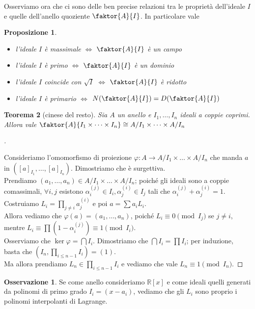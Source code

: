 \documentclass[a4paper,10pt]{article}
\theoremstyle{plain}
\newtheorem{thm}{Teorema}[section]
\newtheorem{prop}[thm]{Proposizione}
\theoremstyle{definition}
\newtheorem*{oss}{Osservazione}
\newenvironment{myproof}[1][\proofname]{%
  \begin{proof}[#1]$ $\par\nobreak\ignorespaces
}{%
  \qedhere
  \end{proof}
}
\newcommand{\R}{\mathbb{R}}
\begin{document}
Osserviamo ora che ci sono delle ben precise relazioni tra le proprietà dell'ideale $I$ e quelle dell'anello quoziente $\faktor{A}{I}$. In particolare vale
\begin{prop}
    $ $
    \begin{itemize}
        \item l'ideale $I$ è massimale $\iff$ $\faktor{A}{I}$ è un campo
        \item l'ideale $I$ è primo $\iff$ $\faktor{A}{I}$ è un dominio
        \item l'ideale $I$ coincide con $\sqrt I$ $\iff$ $\faktor{A}{I}$ è ridotto
        \item l'ideale $I$ è primario $\iff$ $N(\faktor{A}{I})=D(\faktor{A}{I})$
    \end{itemize}
\end{prop}

\begin{thm}[cinese del resto]
    Sia $A$ un anello e $I_1,\dots,I_n$ ideali a coppie coprimi. Allora vale $\faktor{A}{I_1\times\dots\times I_n} \cong A/I_1 \times\dots\times A/I_n$
\end{thm}
\begin{myproof}
    Consideriamo l'omomorfismo di proiezione $\varphi: A\to A/I_1\times\dots\times A/I_n$ che manda $a$ in $([a]_{I_1},\dots,[a]_{I_n})$. Dimostriamo che è surgettiva.\\
    Prendiamo $(a_1,\dots,a_n)\in A/I_1 \times\dots\times A/I_n$; poiché gli ideali sono a coppie comassimali, $\forall i,j$ esistono $\alpha_i^{(j)}\in I_i,\alpha_j^{(i)}\in I_j$ tali che $\alpha_i^{(j)}+\alpha_j^{(i)}=1$.\\
    Costruiamo $L_i=\prod_{j\neq i}a_j^{(i)}$ e poi $a=\sum a_iL_i$.\\
    Allora vediamo che $\varphi(a)=(a_1,\dots,a_n)$, poiché $L_i\equiv0\pmod{I_j}$ se $j\neq i$, mentre $L_i\equiv\prod(1-\alpha_i^{(j)})\equiv1\pmod{I_i}$.\\
    Osserviamo che $\ker\varphi=\bigcap I_i$. Dimostriamo che $\bigcap I_i=\prod I_i$; per induzione, basta che $(I_n,\prod_{i\le n-1}I_i)=(1)$.\\
    Ma allora prendiamo $L_n\in\prod_{i\le n-1}I_i$ e vediamo che vale $L_n\equiv1\pmod{I_n}$.
\end{myproof}
\begin{oss}
    Se come anello consideriamo $\R[x]$ e come ideali quelli generati da polinomi di primo grado $I_i=(x-a_i)$, vediamo che gli $L_i$ sono proprio i polinomi interpolanti di Lagrange.
\end{oss}
\end{document}
